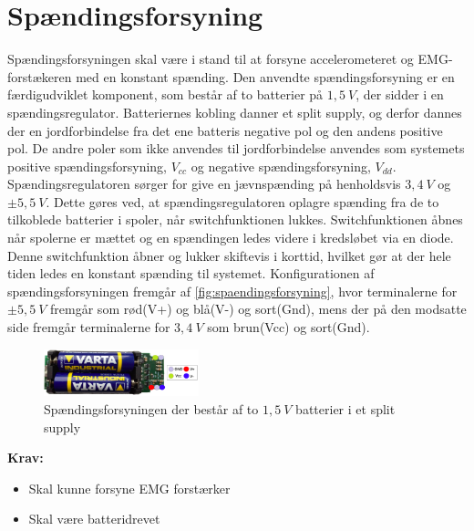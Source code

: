 \section{Spændingsforsyning}
Spændingsforsyningen skal være i stand til at forsyne accelerometeret og EMG-forstækeren med en konstant spænding. Den anvendte spændingsforsyning er en færdigudviklet komponent, som består af to batterier på $1,5~V$, der sidder i en spændingsregulator. Batteriernes kobling danner et split supply, og derfor dannes der en jordforbindelse fra det ene batteris negative pol og den andens positive pol. De andre poler som ikke anvendes til jordforbindelse anvendes som systemets positive spændingsforsyning, ${V}_{cc}$ og negative spændingsforsyning, ${V}_{dd}$.
Spændingsregulatoren sørger for give en jævnspænding på henholdsvis $3,4~V$ og $\pm 5,5~V$. Dette gøres ved, at spændingsregulatoren oplagre spænding fra de to tilkoblede batterier i spoler, når switchfunktionen lukkes. Switchfunktionen åbnes når spolerne er mættet og en spændingen ledes videre i kredsløbet via en diode. Denne switchfunktion åbner og lukker skiftevis i korttid, hvilket gør at der hele tiden ledes en konstant spænding til systemet. 
Konfigurationen af spændingsforsyningen fremgår af \autoref{fig:spaendingsforsyning}, hvor terminalerne for $\pm 5,5~V$ fremgår som rød(V+) og blå(V-) og sort(Gnd), mens der på den modsatte side fremgår terminalerne for $3,4~V$ som brun(Vcc) og sort(Gnd). 

\begin{figure}[H]
\centering
\includegraphics[width=0.4\textwidth]{figures/spaendingsforsyning}
\caption{Spændingsforsyningen der består af to $1,5~V$ batterier i et split supply}
\label{fig:spaendingsforsyning}
\end{figure}

\textbf{Krav:}
\begin{itemize} 
\item Skal kunne forsyne EMG forstærker
\item Skal være batteridrevet 
\end{itemize}
